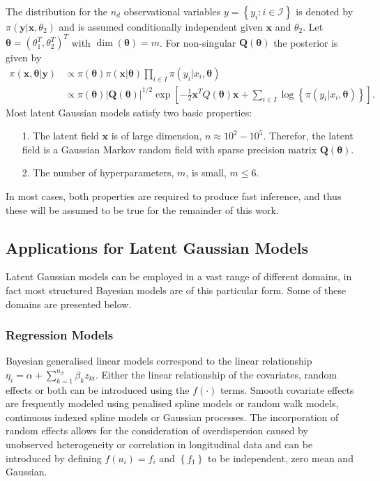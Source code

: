 \documentclass[12pt]{book}
\begin{document}
The distribution for the $n_d$ observational variables $y=\left\lbrace y_i:i\in\mathcal{I}\right\rbrace$ is denoted by $\pi\left(\pmb{y}|\pmb{x}, \theta_2\right)$ and is assumed conditionally independent given $\pmb{x}$ and $\theta_2$. Let $\pmb{\theta}=\left(\theta_1^T,\theta_2^T\right)^T$ with $\dim\left(\pmb{\theta}\right)=m$. For non-singular $\pmb{Q}\left(\pmb{\theta}\right)$ the posterior is given by
\begin{align}
    \pi\left(\pmb{x},\pmb{\theta}|\pmb{y}\right)&\propto\pi\left(\pmb{\theta}\right)\pi\left(\pmb{x}|\pmb{\theta}\right)\prod_{i\in I}\pi\left(y_i|x_i,\pmb{\theta}\right) \nonumber\\
    &\propto \pi\left(\pmb{\theta}\right)\left|\pmb{Q}\left(\pmb{\theta}\right)\right|^{1/2}\exp\left[-\frac{1}{2}\pmb{x}^TQ\left(\pmb{\theta}\right)\pmb{x}+\sum_{i\in I}\log\left\lbrace\pi\left(y_i|x_i,\pmb{\theta}\right)\right\rbrace\right].
\end{align}
Most latent Gaussian models satisfy two basic properties:
\begin{itemize}
    \item[1.] The latent field $\pmb{x}$ is of large dimension, $n\approx10^2-10^5$. Therefor, the latent field is a Gaussian Markov random field with sparse precision matrix $\pmb{Q}\left(\pmb{\theta}\right)$.
    \item[2.] The number of hyperparameters, $m$, is small, $m\leq6$.
\end{itemize}
In most cases, both properties are required to produce fast inference, and thus these will be assumed to be true for the remainder of this work\autocite[Cf.][]{rue2009approximate}.
\subsection{Applications for Latent Gaussian Models}
Latent Gaussian models can be employed in a vast range of different domains, in fact most structured Bayesian models are of this particular form. Some of these domains are presented below.
\subsubsection*{Regression Models}
Bayesian generalised linear models correspond to the linear relationship $\eta_i=\alpha+\sum_{k=1}^{n_\beta}\beta_k z_{ki}.$ Either the linear relationship of the covariates, random effects or both can be introduced using the $f\left(\cdot\right)$ terms. Smooth covariate effects are frequently modeled using penalised spline models or random walk models, continuous indexed spline models or Gaussian processes. The incorporation of random effects allows for the consideration of overdispersion caused by unobserved heterogeneity or correlation in longitudinal data and can be introduced by defining $f\left(u_i\right)=f_i$ and $\left\lbrace f_1\right\rbrace$ to be independent, zero mean and Gaussian.
\end{document}
